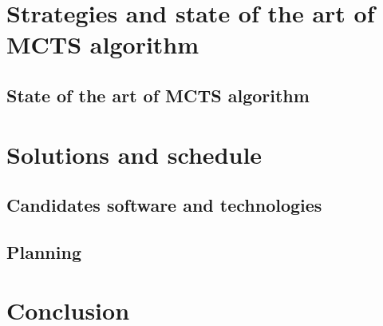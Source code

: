 \documentclass[12pt]{article}
\begin{document}
\section{Strategies and state of the art of MCTS algorithm}

\subsection{State of the art of MCTS algorithm}

\section{Solutions and schedule}
\subsection{Candidates software and technologies}
\subsection {Planning} 

\section{Conclusion}



\end{document}
